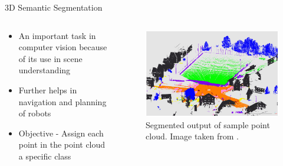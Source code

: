 \documentclass[aspectratio=169]{beamer}
\begin{document}
\begin{frame}{3D Semantic Segmentation}
    \begin{columns}
       \begin{column}{0.4\textwidth}
            \begin{itemize}
                \item An important task in computer vision because of its use in scene understanding
                \item Further helps in navigation and planning of robots
                \item Objective - Assign each point in the point cloud a specific class
            \end{itemize}       
       \end{column}
       \begin{column}{0.6\textwidth}
            \begin{figure}
                \centering
                \includegraphics[scale=0.3]{images/sample_LiDAR_PC_segmented.jpg}
                \caption{Segmented output of sample point cloud. Image taken from \cite{hackel2017semantic3d}.}
                \label{fig:sample_lidar_pc_segmented}
            \end{figure}
       \end{column}
    \end{columns}
\end{frame}
\end{document}
